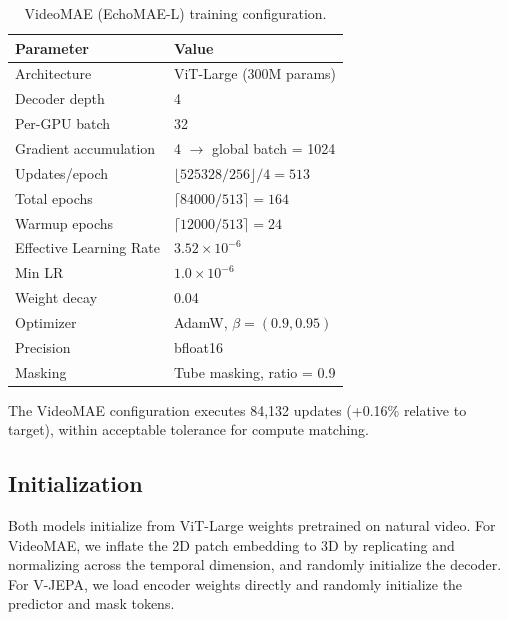 \documentclass{article}
\theoremstyle{plain}
\theoremstyle{definition}
\theoremstyle{remark}
\begin{document}
\begin{table}[h]
\centering
\small
\begin{tabular}{ll}
\toprule
\textbf{Parameter} & \textbf{Value} \\
\midrule
Architecture & ViT-Large (300M params) \\
Decoder depth & 4 \\
Per-GPU batch & 32 \\
Gradient accumulation & 4 $\rightarrow$ global batch = 1024 \\
Updates/epoch & $\lfloor 525328 / 256 \rfloor / 4 = 513$ \\
Total epochs & $\lceil 84000 / 513 \rceil = 164$ \\
Warmup epochs & $\lceil 12000 / 513 \rceil = 24$ \\
\midrule
Effective Learning Rate & $3.52 \times 10^{-6}$ \\ %
Min LR & $1.0 \times 10^{-6}$ \\
Weight decay & 0.04 \\
Optimizer & AdamW, $\beta = (0.9, 0.95)$ \\
Precision & bfloat16 \\
\midrule
Masking & Tube masking, ratio = 0.9 \\
\bottomrule
\end{tabular}
\caption{VideoMAE (EchoMAE-L) training configuration.}
\label{tab:videomae-config}
\end{table}

The VideoMAE configuration executes 84,132 updates (+0.16\% relative to target), within acceptable tolerance for compute matching.


\clearpage
\subsection{Initialization}

Both models initialize from ViT-Large weights pretrained on natural video. For VideoMAE, we inflate the 2D patch embedding to 3D by replicating and normalizing across the temporal dimension, and randomly initialize the decoder. For V-JEPA, we load encoder weights directly and randomly initialize the predictor and mask tokens.

\end{document}
